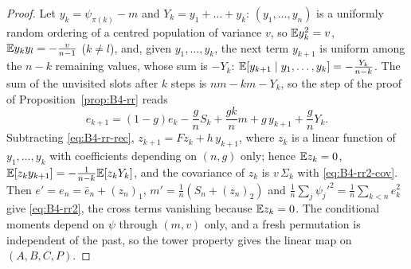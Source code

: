 \begin{proof}
Let $y_k=\psi_{\pi(k)}-m$ and $Y_k=y_1+\dots+y_k$: $(y_1,\dots,y_n)$ is a uniformly random ordering of a centred population of variance $v$, so $\mathbb{E} y_k^2=v$, $\mathbb{E} y_ky_l=-\frac v{n-1}$ ($k\ne l$), and, given $y_1,\dots,y_k$, the next term $y_{k+1}$ is uniform among the $n-k$ remaining values, whose sum is $-Y_k$: $\mathbb{E}[y_{k+1}\mid y_1,\dots,y_k]=-\frac{Y_k}{n-k}$. The sum of the unvisited slots after $k$ steps is $nm-km-Y_k$, so the step of the proof of Proposition~\ref{prop:B4-rr} reads
\[
e_{k+1}=(1-g)e_k-\frac gnS_k+\frac{gk}nm+g\,y_{k+1}+\frac gnY_k .
\]
Subtracting \eqref{eq:B4-rr-rec}, $z_{k+1}=Fz_k+h\,y_{k+1}$, where $z_k$ is a linear function of $y_1,\dots,y_k$ with coefficients depending on $(n,g)$ only; hence $\mathbb{E} z_k=0$, $\mathbb{E}[z_ky_{k+1}]=-\frac1{n-k}\mathbb{E}[z_kY_k]$, and the covariance of $z_k$ is $v\,\Sigma_k$ with \eqref{eq:B4-rr2-cov}. Then $e'=e_n=\bar e_n+(z_n)_1$, $m'=\frac1n(S_n+(z_n)_2)$ and $\frac1n\sum_j\psi_j'^2=\frac1n\sum_{k<n}e_k^2$ give \eqref{eq:B4-rr2}, the cross terms vanishing because $\mathbb{E} z_k=0$. The conditional moments depend on $\psi$ through $(m,v)$ only, and a fresh permutation is independent of the past, so the tower property gives the linear map on $(A,B,C,P)$.
\end{proof}

